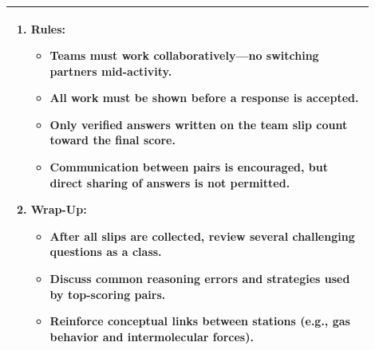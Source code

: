 \documentclass{article}
\begin{document}
\begin{tabular}{|p{0.9\linewidth}|}
\begin{enumerate}
    \item \textbf{Rules:}
    \begin{itemize}
        \item Teams must work collaboratively—no switching partners mid-activity.
        \item All work must be shown before a response is accepted.
        \item Only verified answers written on the team slip count toward the final score.
        \item Communication between pairs is encouraged, but direct sharing of answers is not permitted.
    \end{itemize}

    \item \textbf{Wrap-Up:}
    \begin{itemize}
        \item After all slips are collected, review several challenging questions as a class.
        \item Discuss common reasoning errors and strategies used by top-scoring pairs.
        \item Reinforce conceptual links between stations (e.g., gas behavior and intermolecular forces).
    \end{itemize}
\end{enumerate}
\\
\hline
\end{tabular}
\end{document}
